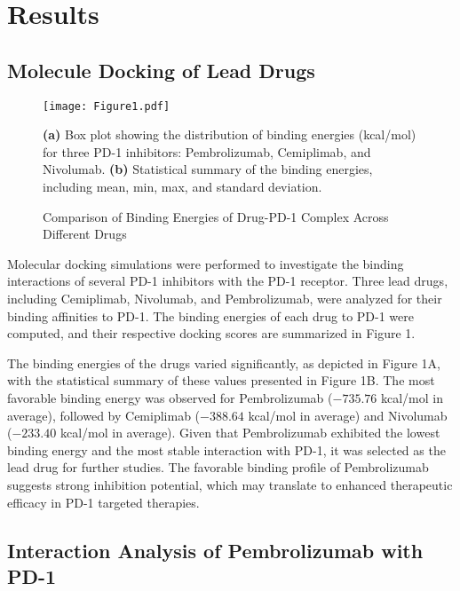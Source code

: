 \documentclass[11pt]{article}
\begin{document}
\section{Results}
\subsection{Molecule Docking of Lead Drugs} 

\begin{figure}[t]
\begin{center}
\texttt{[image: Figure1.pdf]}
\end{center}
\caption{Comparison of Binding Energies of Drug-PD-1 Complex Across Different Drugs}
\textbf{(a)} Box plot showing the distribution of binding energies (kcal/mol) for three PD-1 inhibitors: Pembrolizumab, Cemiplimab, and Nivolumab.
\textbf{(b)} Statistical summary of the binding energies, including mean, min, max, and standard deviation.
\label{fig:fig1}
\end{figure}

Molecular docking simulations were performed to investigate the binding interactions of several PD-1 inhibitors with the PD-1 receptor. Three lead drugs, including Cemiplimab, Nivolumab, and Pembrolizumab, were analyzed for their binding affinities to PD-1. The binding energies of each drug to PD-1 were computed, and their respective docking scores are summarized in Figure 1.

The binding energies of the drugs varied significantly, as depicted in Figure 1A, with the statistical summary of these values presented in Figure 1B. The most favorable binding energy was observed for Pembrolizumab ($-735.76$ kcal/mol in average), followed by Cemiplimab ($-388.64$ kcal/mol in average) and Nivolumab ($-233.40$ kcal/mol in average). Given that Pembrolizumab exhibited the lowest binding energy and the most stable interaction with PD-1, it was selected as the lead drug for further studies. The favorable binding profile of Pembrolizumab suggests strong inhibition potential, which may translate to enhanced therapeutic efficacy in PD-1 targeted therapies.

\subsection{Interaction Analysis of Pembrolizumab with PD-1}
\end{document}
